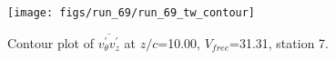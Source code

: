 \begin{figure}[H]
\centering
\texttt{[image: figs/run\_69/run\_69\_tw\_contour]}
\caption{Contour plot of $\overline{v_{\theta}^{\prime} v_{z}^{\prime}}$ at $z/c$=10.00, $V_{free}$=31.31, station 7.}
\label{fig:run_69_tw_contour}
\end{figure}


